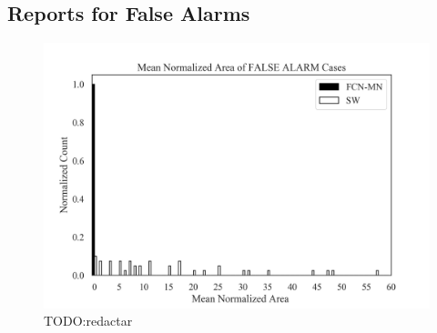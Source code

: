 \documentclass[a4paper,authoryear,review]{elsarticle}
\begin{document}
\subsection{Reports for False Alarms} 
\label{sec:falsealarmsrep}


\begin{figure}%
	\centering
	\includegraphics[width=\textwidth]{figures/AAA_mean_relative_area_fcn_vs_sw.png}%
	\caption{TODO:redactar}
	\label{fig:AAA}
\end{figure}
\end{document}
